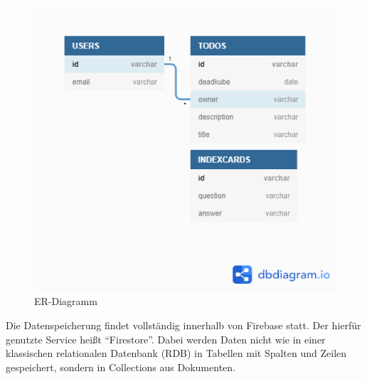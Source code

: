 \begin{figure}[h]%
    \begin{center}
        \includegraphics[width=.7\textwidth]{img/Integrationsseminar ER.png}
        \caption{ER-Diagramm}
        \label{fig:erDiagramm}
    \end{center}
\end{figure}

Die Datenspeicherung findet vollständig innerhalb von Firebase statt.
Der hierfür genutzte Service heißt \enquote{Firestore}.
Dabei werden Daten nicht wie in einer klassischen relationalen Datenbank (\ac{RDB}) in Tabellen mit Spalten und Zeilen gespeichert, sondern in Collections aus Dokumenten.





